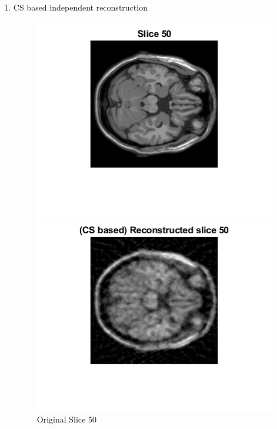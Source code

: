\documentclass[12pt]{article}
\begin{document}
\begin{enumerate}[label = (\alph*)]
    \item CS based independent reconstruction
    \begin{figure}[H]
        \centering
        \begin{minipage}{.45\textwidth}
            \centering
            \includegraphics[width=\linewidth]{Images/Q3_50.png}
            \caption*{Original Slice 50}
        \end{minipage}
        \begin{minipage}{.45\textwidth}
            \centering
            \includegraphics[width=\linewidth]{Images/Q3_Extra_50_b.png}

\end{minipage}
\end{figure}
\end{enumerate}
\end{document}
